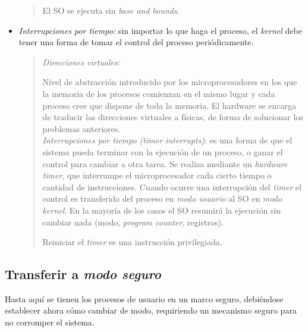 \documentclass[a4paper,10pt,spanish]{article}
\begin{document}
\begin{itemize}
\begin{quote}
El SO se ejecuta sin \textit{base and bounds}.

\end{quote}

\item \textit{Interrupciones por tiempo:} sin importar lo que haga el proceso, el \textit{kernel} debe tener una forma de tomar el control del proceso periódicamente.

\begin{quote}
\textit{Direcciones virtuales:}

Nivel de abstracción introducido por los microprocesadores en los que la memoria de los procesos comienzan en el mismo lugar y cada proceso cree que dispone de toda la memoria. El hardware se encarga de traducir las direcciones virtuales a físicas, de forma de solucionar los problemas anteriores. \\

\textit{Interrupciones por tiempo (timer interrupts)}: es una forma de que el sistema pueda terminar con la ejecución de un proceso, o ganar el control para cambiar a otra tarea. Se realiza mediante un \textit{hardware timer}, que interrumpe el microprocesador cada cierto tiempo o cantidad de instrucciones. Cuando ocurre una interrupción del \textit{timer} el control es transferido del proceso en \textit{modo usuario} al SO en \textit{modo kernel}. En la mayoría de los casos el SO resumirá la ejecución sin cambiar nada (modo, \textit{program counter}, registros).

Reiniciar el \textit{timer} es una instrucción privilegiada.
\end{quote}

\end{itemize}

\subsection{Transferir a \textit{modo seguro}}

Hasta aquí se tienen los procesos de usuario en un marco seguro, debiéndose establecer ahora cómo cambiar de modo, requiriendo un mecanismo seguro para no corromper el sistema. \\
\end{document}
